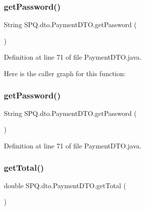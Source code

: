 \subsubsection{\texorpdfstring{get\+Password()}{getPassword()}\hspace{0.1cm}{\footnotesize\ttfamily [2/3]}}
{\footnotesize\ttfamily String S\+P\+Q.\+dto.\+Payment\+D\+T\+O.\+get\+Password (\begin{DoxyParamCaption}{ }\end{DoxyParamCaption})}



Definition at line 71 of file Payment\+D\+T\+O.\+java.

Here is the caller graph for this function\+:
\mbox{\label{class_s_p_q_1_1dto_1_1_payment_d_t_o_ae012449dd0baea7f169bb64dcf973dec}} 
\subsubsection{\texorpdfstring{get\+Password()}{getPassword()}\hspace{0.1cm}{\footnotesize\ttfamily [3/3]}}
{\footnotesize\ttfamily String S\+P\+Q.\+dto.\+Payment\+D\+T\+O.\+get\+Password (\begin{DoxyParamCaption}{ }\end{DoxyParamCaption})}



Definition at line 71 of file Payment\+D\+T\+O.\+java.

\mbox{\label{class_s_p_q_1_1dto_1_1_payment_d_t_o_a04cd2104d07971407126fcf75ef17d5b}} 
\subsubsection{\texorpdfstring{get\+Total()}{getTotal()}\hspace{0.1cm}{\footnotesize\ttfamily [1/3]}}
{\footnotesize\ttfamily double S\+P\+Q.\+dto.\+Payment\+D\+T\+O.\+get\+Total (\begin{DoxyParamCaption}{ }\end{DoxyParamCaption})}



